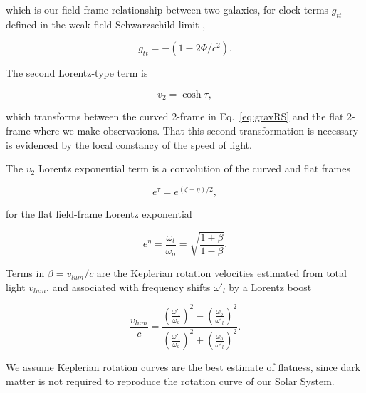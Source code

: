 \documentclass[reprint,%
 amsmath,amssymb,
 aps,
]{revtex4-1}
\begin{document}
which  is our field-frame relationship between two galaxies, for  clock terms $g_{tt}$   defined in the   weak field Schwarzschild limit  \cite{Hartle}, 
 
  \begin{equation}
      g_{tt}= -( 1 - 2\Phi/ c^2).
      \label{clocktime}
  \end{equation} 
  








The second Lorentz-type term is  

\begin{equation}
v_{2} =  \cosh \tau, 
\label{eq:hyperbolico}
\end{equation}

 which  transforms between the  curved 2-frame   in  Eq.~\ref{eq:gravRS} and  the flat 2-frame where we make observations. 
 That this second transformation  is necessary is evidenced by the local constancy of the speed of light. 
 
 The   $v_2$   Lorentz exponential term  is a  convolution of  the curved and flat frames
 
\begin{equation}
    e^{\tau}=   e^{(\zeta+\eta)/2},
\end{equation}
 
for the  flat field-frame
Lorentz exponential  

\begin{equation}
    e^{\eta}=\frac{\omega_{l}}{\omega_o}= \sqrt{\frac{1+\beta}{1-\beta}}.   
    \label{eq:flat}
\end{equation}  
     
Terms in 
$\beta = v_{lum}/c$ are the
Keplerian rotation velocities  estimated from total light  $v_{lum}$, and  associated with  frequency shifts $\omega'_{l}$      by a Lorentz boost   

 \begin{equation}
 \frac{v_{lum} }{c}=
\frac{  \left( \frac{\omega'_{l}}{\omega_o}\right)^2 -  \left( \frac{\omega_o}{\omega'_{l}} \right)^2 }{  \left( \frac{\omega'_{l}}{\omega_o}\right)^2  +  \left( \frac{\omega_o}{\omega'_{l}}\right)^2 }. 
\label{eq:lumlorentz}
\end{equation} 
 
 
We assume Keplerian rotation curves are     the best estimate of flatness, since dark matter is not required to  reproduce the rotation curve of our Solar System.  
 
\end{document}
